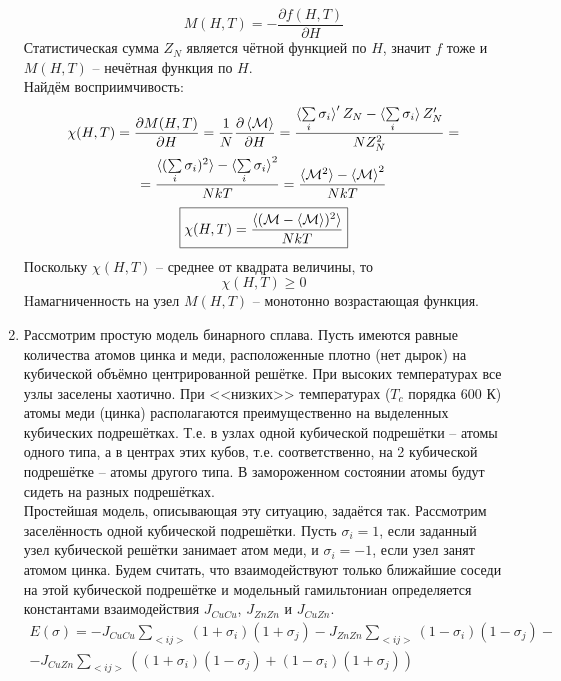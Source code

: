 \documentclass[12pt]{article}
\theoremstyle{definition}
\begin{document}
\begin{enumerate}
    \begin{equation}
        M(H,T)=-\frac{\partial f(H,T)}{\partial H}
    \end{equation}
    Статистическая сумма $Z_N$ является чётной функцией по $H$, значит $f$ тоже и $M(H,T)$ -- нечётная функция по $H$.\\
    Найдём восприимчивость:
    \begin{multline}
        \chi(H,T)=\frac{\partial M(H,T)}{\partial H}=\frac{1}{N}\frac{\partial\braket{\mathcal{M}}}{\partial H}=\frac{\braket{\sum\limits_i\sigma_i}'Z_N-\braket{\sum\limits_i\sigma_i}Z'_N}{NZ^2_N}=\\=\frac{\braket{(\sum\limits_i\sigma_i)^2}-\braket{\sum\limits_i\sigma_i}^2}{NkT}=\frac{\braket{\mathcal{M}^2}-\braket{\mathcal{M}}^2}{NkT}
    \end{multline}
    \begin{equation}
        \boxed{\chi(H,T)=\frac{\braket{(\mathcal{M}-\braket{\mathcal{M}})^2}}{NkT}}
    \end{equation}
    Поскольку $\chi(H,T)$ -- среднее от квадрата величины, то
    \begin{equation}
        \chi(H,T)\geq0
    \end{equation}
    Hамагниченность на узел $M(H,T)$ -- монотонно возрастающая функция.
    \item Рассмотрим простую модель бинарного сплава. Пусть имеются равные количества атомов цинка и меди, расположенные плотно (нет дырок) на кубической объёмно центрированной решётке. При высоких температурах все узлы заселены хаотично. При <<низких>> температурах ($T_c$ порядка 600 К) атомы меди (цинка) располагаются преимущественно на выделенных кубических подрешётках. Т.е. в узлах одной кубической подрешётки -- атомы одного типа, а в центрах этих кубов, т.е. соответственно, на 2 кубической подрешётке -- атомы другого типа. В замороженном состоянии атомы будут сидеть на разных подрешётках.\\
    Простейшая модель, описывающая эту ситуацию, задаётся так. Рассмотрим заселённость одной кубической подрешётки. Пусть $\sigma_i=1$, если заданный узел кубической решётки занимает атом меди, и $\sigma_i=-1$, если узел занят атомом цинка. Будем считать, что взаимодействуют только ближайшие соседи на этой кубической подрешётке и модельный гамильтониан определяется константами взаимодействия $J_{CuCu}$, $J_{ZnZn}$ и $J_{CuZn}$.
    \begin{multline}
        E(\sigma)=-J_{CuCu}\sum\limits_{<ij>}(1+\sigma_i)(1+\sigma_j)-J_{ZnZn}\sum\limits_{<ij>}(1-\sigma_i)(1-\sigma_j)-\\-J_{CuZn}\sum\limits_{<ij>}((1+\sigma_i)(1-\sigma_j)+(1-\sigma_i)(1+\sigma_j))

\end{multline}
\end{enumerate}
\end{document}
